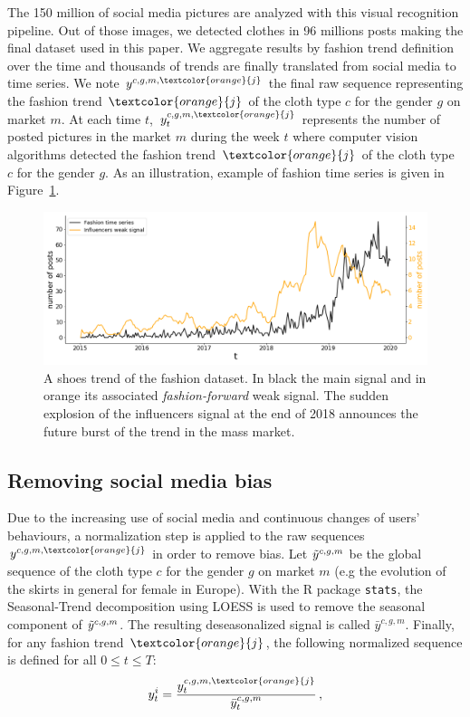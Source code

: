 \documentclass[10pt]{article} %
\begin{document}
The 150 million of social media pictures are analyzed with this visual recognition pipeline. Out of those images, we detected clothes in 96 millions posts making the final dataset used in this paper. We aggregate results by fashion trend definition over the time and  thousands of trends are finally translated from social media to time series. We note $y^{c,g,m,\textcolor{orange}{j}}$ the final raw sequence representing the fashion trend $\textcolor{orange}{j}$ of the cloth type $c$ for the gender $g$ on market $m$. At each time $t$, $y^{c,g,m,\textcolor{orange}{j}}_t$ represents the number of posted pictures in the market $m$ during the week $t$ where computer vision algorithms detected the fashion trend $\textcolor{orange}{j}$ of the cloth type $c$ for the gender $g$. As an illustration, example of fashion time series is given in Figure~\ref{fig:oneemergingtrend}.

\begin{figure}
  \centering
    \includegraphics[width=1.\linewidth]{br_female_shoes_262}
  \caption{A shoes trend of the fashion dataset. In black the main signal and in orange its associated \textit{fashion-forward} weak signal. The sudden explosion of the influencers signal at the end of 2018 announces the future burst of the trend in the mass market.}
\label{fig:oneemergingtrend}
\end{figure}

\subsection{Removing social media bias}
\label{sec:dataset:b}

Due to the increasing use of social media and continuous changes of users' behaviours, a normalization step is applied to the raw sequences $y^{c,g,m,\textcolor{orange}{j}}$ in order to remove bias. Let $\Tilde{y}^{c,g,m}$ be the global sequence of the cloth type $c$ for the gender $g$ on market $m$ (e.g the evolution of the skirts in general for female in Europe). With the R package \texttt{stats}, the Seasonal-Trend decomposition using LOESS  \citep{cleveland1990} is used to remove the seasonal component of $\Tilde{y}^{c,g,m}$. The resulting deseasonalized signal is called  $\bar{y}^{c,g,m}$. Finally, for any fashion trend $\textcolor{orange}{j}$, the following normalized sequence is defined for all $ 0 \leq t \leq T$:
\begin{equation}
    y^{i}_t = \frac{y^{c,g,m,\textcolor{orange}{j}}_{t}}{\bar{y}^{c,g,m}_t}\,,
\end{equation}
\end{document}
